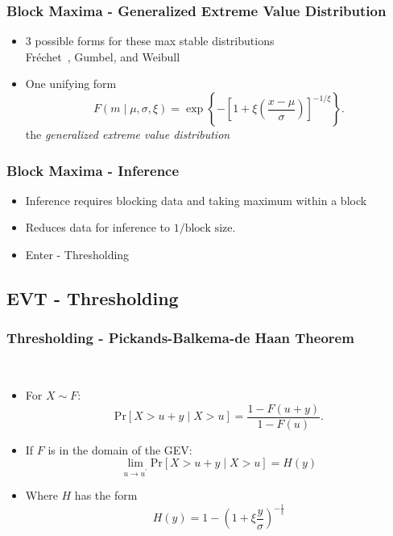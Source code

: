 \documentclass[aspectratio=169]{beamer}
\begin{document}
\begin{frame}
  \frametitle{Block Maxima - Generalized Extreme Value Distribution}
  \begin{itemize}
    \item 3 possible forms for these max stable distributions\\
      \hspace{1cm}Fr{\'e}chet~\citep{frechet1927}, Gumbel, and Weibull~\citep{fisher1928}
    \pause
    \item One unifying form~\citep{jenkinson1955}
      \begin{equation*}
        F(m \mid \mu, \sigma, \xi) = \exp\left\lbrace-\left[1 +
              \xi\left(\frac{x - \mu}{\sigma}\right)\right]_{}^{-1/{\xi}}\right\rbrace.
      \end{equation*}
      the \emph{generalized extreme value distribution}
  \end{itemize}
\end{frame} %
\begin{frame}
  \frametitle{Block Maxima - Inference}
  \begin{itemize}
    \item Inference requires blocking data and taking maximum within a block
    \item Reduces data for inference to $1 / \text{block size}$.
    \item Enter - Thresholding
  \end{itemize}
\end{frame} %

\subsection{EVT - Thresholding}

\begin{frame}
  \frametitle{Thresholding - Pickands-Balkema-de Haan Theorem}
  {\scriptsize\cite{dehaan2006}}\\
  \begin{itemize}
    \item For $X \sim F$:
      \begin{equation*}
        \text{Pr}\left[X > u + y\mid X > u\right] = \frac{1 - F(u + y)}{1 - F(u)}.
      \end{equation*}
    \pause
    \item If $F$ is in the domain of the GEV:
      \begin{equation*}
        \lim\limits_{u\to u^{\prime}}\text{Pr}\left[X > u + y\mid X > u\right] = H(y)
      \end{equation*}
    \pause
    \item Where $H$ has the form
      \begin{equation*}
        H(y) = 1 - \left(1 + \xi\frac{y}{\sigma}\right)^{-\frac{1}{\xi}}
      \end{equation*}
  \end{itemize}
\end{frame} %
\end{document}

